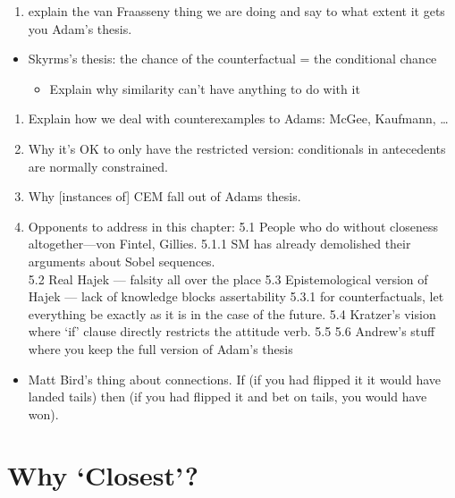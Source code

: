 \documentclass[leqno, 11pt, a5paper, openany]{article}
\begin{document}
\begin{enumerate}
\item
  explain the van Fraasseny thing we are doing and say to what extent it
  gets you Adam's thesis.
\end{enumerate}

\begin{itemize}
\item
  Skyrms's thesis: the chance of the counterfactual = the conditional
  chance

  \begin{itemize}
    \item
    Explain why similarity can't have anything to do with it
  \end{itemize}
\end{itemize}

\begin{enumerate}
\item
  Explain how we deal with counterexamples to Adams: McGee, Kaufmann,
  \ldots{}
\item
  Why it's OK to only have the restricted version: conditionals in
  antecedents are normally constrained.
\item
  Why {[}instances of{]} CEM fall out of Adams thesis.\\
\item
  Opponents to address in this chapter: 5.1 People who do without
  closeness altogether---von Fintel, Gillies. 5.1.1 SM has already
  demolished their arguments about Sobel sequences.\\
  5.2 Real Hajek --- falsity all over the place 5.3 Epistemological
  version of Hajek --- lack of knowledge blocks assertability 5.3.1 for
  counterfactuals, let everything be exactly as it is in the case of the
  future. 5.4 Kratzer's vision where ‘if’ clause directly restricts the
  attitude verb. 5.5 5.6 Andrew's stuff where you keep the full version
  of Adam's thesis
\end{enumerate}

\begin{itemize}
\item
  Matt Bird's thing about connections. If (if you had flipped it it
  would have landed tails) then (if you had flipped it and bet on tails,
  you would have won).
\end{itemize}

\section{\texorpdfstring{Why
‘Closest’?}{Why Closest?}}\label{why-closest}
\end{document}

